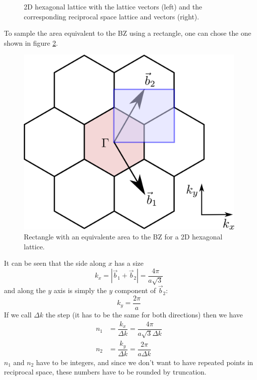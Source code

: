 \documentclass[a4paper,12pt]{report}
\begin{document}
\begin{figure}[h]
 \caption{2D hexagonal lattice with the lattice vectors (left)
 and the corresponding reciprocal space lattice and vectors (right).}
 \label{fig:2D hexagonal}
\end{figure}

To sample the area equivalent to the BZ using a rectangle, one can chose the one shown
in figure \ref{fig:BZ_2D hexagonal}.

\begin{figure}[h]
 \centering
 \includegraphics[scale=0.1,keepaspectratio=true]{figures/BZ.png}
 \caption{Rectangle with an equivalente area to the BZ for a 2D hexagonal lattice.}
 \label{fig:BZ_2D hexagonal}
\end{figure}

It can be seen that the side along $x$ has a size
\begin{equation}
 k_x = |\vec{b}_1 + \vec{b}_2| = \dfrac{4\pi}{a\sqrt{3}}
\end{equation}
and along the $y$ axis is simply the $y$ component of $\vec{b}_2$:
\begin{equation}
 k_y = \dfrac{2\pi}{a}
\end{equation}
If we call $\Delta k$ the step (it has to be the same for both directions)
then we have
\begin{align*}
 n_1 &= \dfrac{k_x}{\Delta k} = \dfrac{4\pi}{a\sqrt{3}\Delta k} \\
 n_2 &= \dfrac{k_y}{\Delta k} = \dfrac{2\pi}{a\Delta k}
\end{align*}
$n_1$ and $n_2$ have to be integers, and since we don't want to have
repeated points in reciprocal space, these numbers have to be rounded
by truncation.
\end{document}

